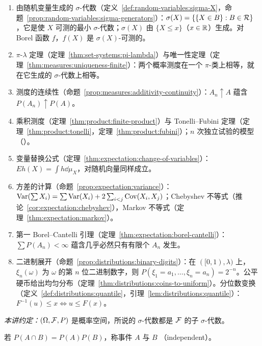 \begin{enumerate}
\item 由随机变量生成的 $\sigma$-代数（定义~\ref{def:random-variables:sigma-X}，命题~\ref{prop:random-variables:sigma-generators}）：$\sigma(X)=\{\{X\in B\}:B\in\mathcal{R}\}$，它是使 $X$ 可测的最小 $\sigma$-代数；$\sigma(X)$ 由 $\{X\leqslant x\}$（$x\in\mathbb{R}$）生成。对 Borel 函数 $f$，$f(X)$ 是 $\sigma(X)$-可测的。
\item $\pi$-$\lambda$ 定理（定理~\ref{thm:set-systems:pi-lambda}）与唯一性定理（定理~\ref{thm:measures:uniqueness-finite}）：两个概率测度在一个 $\pi$-类上相等，就在它生成的 $\sigma$-代数上相等。
\item 测度的连续性（命题~\ref{prop:measures:additivity-continuity}）：$A_n\uparrow A$ 蕴含 $P(A_n)\uparrow P(A)$。
\item 乘积测度（定理~\ref{thm:product:finite-product}）与 Tonelli--Fubini 定理（定理~\ref{thm:product:tonelli}，定理~\ref{thm:product:fubini}）；$n$ 次独立试验的模型（）。
\item 变量替换公式（定理~\ref{thm:expectation:change-of-variables}）：$Eh(X)=\int h\dd\mu_X$，对随机向量同样成立。
\item 方差的计算（命题~\ref{prop:expectation:variance}）：$\operatorname{Var}(\sum X_i)=\sum\operatorname{Var}(X_i)+2\sum_{i<j}\operatorname{Cov}(X_i,X_j)$；Chebyshev 不等式（推论~\ref{cor:expectation:chebyshev}），Markov 不等式（定理~\ref{thm:expectation:markov}）。
\item 第一 Borel--Cantelli 引理（定理~\ref{thm:expectation:borel-cantelli}）：$\sum P(A_n)<\infty$ 蕴含几乎必然只有有限个 $A_n$ 发生。
\item 二进制展开（命题~\ref{prop:distributions:binary-digits}）：在 $([0,1),\lambda)$ 上，$\xi_n(\omega)$ 为 $\omega$ 的第 $n$ 位二进制数字，则 $P(\xi_1=a_1,\dots,\xi_n=a_n)=2^{-n}$。公平硬币给出均匀分布（定理~\ref{thm:distributions:coins-to-uniform}）。分位数变换（定义~\ref{def:distributions:quantile}，引理~\ref{lem:distributions:quantile}）：$F^{-1}(u)\leqslant x\iff u\leqslant F(x)$。
\end{enumerate}

\emph{本讲约定：}$(\Omega,\mathcal{F},P)$ 是概率空间，所说的 $\sigma$-代数都是 $\mathcal{F}$ 的子 $\sigma$-代数。


\begin{definition}[两个事件的独立性]\label{def:independence:two-events}
若 $P(A\cap B)=P(A)P(B)$，称事件 $A$ 与 $B$ （independent）。
\end{definition}

